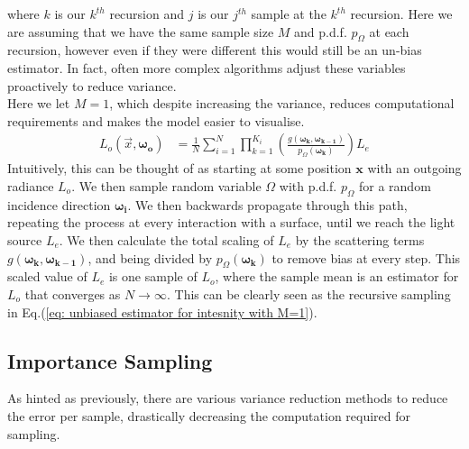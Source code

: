 \documentclass{article}
\begin{document}
where $k$ is our $k^{th}$ recursion and $j$ is our $j^{th}$ sample at the $k^{th}$ recursion.
Here we are assuming that we have the same sample size $M$ and p.d.f. $p_\Omega$ at each recursion, 
however even if they were different this would still be an un-bias estimator. 
In fact, often more complex algorithms adjust these variables proactively to reduce variance. 
\\
Here we let $M=1$, which despite increasing the variance, reduces computational requirements
and makes the model easier to visualise. 
\begin{align}
    L_o(\vec{x},\boldsymbol{\omega_o}) \label{eq: unbiased estimator for intesnity with M=1}
    &= \frac{1}{N} \sum_{i=1}^{N} \prod_{k=1}^{K_i} 
    \left( \frac{g(\boldsymbol{\omega_{k}},\boldsymbol{\omega_{k-1}})}
    {p_\Omega(\boldsymbol{\omega_{k}})} \right) L_e
\end{align}
Intuitively, this can be thought of as starting at some position $\boldsymbol{x}$
with an outgoing radiance $L_o$.
We then sample random variable $\Omega$ with p.d.f. $p_\Omega$ for a random
incidence direction $\boldsymbol{\omega_i}$.
We then backwards propagate through this path, repeating the process at every interaction with a surface,
until we reach the light source $L_e$. We then calculate the total scaling of $L_e$ by the scattering
terms $g(\boldsymbol{\omega_{k}},\boldsymbol{\omega_{k-1}})$, and being divided by $p_\Omega(\boldsymbol{\omega_k})$ to remove bias at every step. 
This scaled value of $L_e$ is one sample of $L_o$, where the sample mean is an estimator for $L_o$
that converges as $N\rightarrow\infty$.
This can be clearly seen as the recursive sampling in 
Eq.(\ref{eq: unbiased estimator for intesnity with M=1}).

\subsection{Importance Sampling}
As hinted as previously, there are various variance reduction methods to reduce the error per sample,
drastically decreasing the computation required for sampling.
\end{document}
